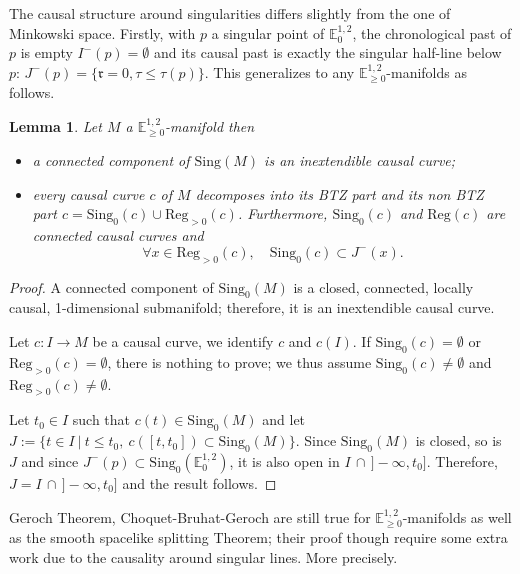 \documentclass[a4paper,12pt]{article}
\def\r{\mathfrak{r}}
\def\sing{\mathrm{Sing}}
\newcommand{\mass}[1]{{\mathbb E}^{1,2}_{#1}}
\def\Reg{\mathrm{Reg}}
\def\reg{\Reg}
\newtheorem{lemou}{Lemma}[section]          %
\begin{document}
The causal structure around singularities differs slightly from the one of Minkowski space.
 Firstly, with $p$ a singular point of $\mass{0}$, the chronological past of $p$ is empty $I^-(p)=\emptyset$ and its causal past is exactly the singular half-line below $p$: $J^-(p) = \{\r=0,\tau\leq \tau(p)\}$.  This generalizes to any $\mass{\geq0}$-manifolds as follows.
	 \begin{lemou} \label{lem:past_BTZ}
	    Let $M$ a $\mass{\geq0}$-manifold then
	    \begin{itemize}
	    \item a connected component of $\sing(M)$ is an inextendible causal curve;
	    \item every causal curve $c$ of $M$ decomposes into its BTZ part and its non BTZ part $c=\sing_0(c)\cup \reg_{>0}(c)$. Furthermore, $\sing_0(c)$ and $\reg(c)$ are connected causal curves and $$\forall x\in \Reg_{>0}(c),\quad \sing_0(c) \subset J^-(x).$$
	  \end{itemize}
	\end{lemou}
	\begin{proof}
	  A connected component of $\sing_0(M)$ is a closed, connected, locally causal, 1-dimen\-sional submanifold; therefore, 
	  it is an inextendible causal curve. 
	  
	  Let $c:I\rightarrow M$ be a causal curve, we identify $c$ and $c(I)$. If $\sing_0(c)=\emptyset$ or $\reg_{>0}(c)=\emptyset$, there is nothing to prove; 
	  we thus assume $\sing_0(c)\neq\emptyset$ and $\reg_{>0	}(c)\neq \emptyset$. 
	  
	  Let $t_0\in I$ such that $c(t)\in \sing_0(M)$ and let $J:=\{t\in I~|~t\leq t_0, ~ c([t,t_0])\subset \sing_0(M)\}$. Since $
	  \sing_0(M)$	 is closed, so is $J$ and since $J^-(p)\subset 
	  \sing_0(\mass{0})$, it is also open in $I\,\cap\, ]-\infty,t_0]$. Therefore, $J=I\,\cap\, ]-\infty,t_0]$ and the result follows.
	
	
	\end{proof}
 



Geroch Theorem, Choquet-Bruhat-Geroch are still true for $\mass{\geq 0}$-manifolds as well as the smooth spacelike splitting Theorem; their proof though require some extra work due to the causality around singular lines. More precisely.
\end{document}

